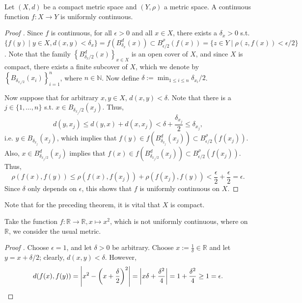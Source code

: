 \begin{theorem}\label{thrm:cont_func_on_comp_metric_space_uniformly_continuous}
	Let $(X, d)$ be a compact metric space and $(Y, \rho)$ a metric space. A continuous function $f: X\to Y$ is uniformly continuous. 
\end{theorem}

\begin{proof}[Proof \cite{1605098}]
	Since $f$ is continuous, for all $\epsilon > 0$ and all $x\in X$, there exists a $\delta_x > 0$ s.t. $\{f(y)\mid y\in X, d(x, y) < \delta_x\} = f\left(B^{d}_{\delta_x}(x)\right) \subset B^{\rho}_{\epsilon/2}(f(x)) = \{z\in Y\mid \rho(z, f(x)) < \epsilon/2\}$. Note that the family $\left\{B_{\delta_x/2}^{d}(x)\right\}_{x\in X}$ is an open cover of $X$, and since $X$ is compact, there exists a finite subcover of $X$, which we denote by $\left\{B_{\delta_{x_i/2}}(x_i)\right\}_{i=1}^{n}$, where $n\in\mathbb N$. Now define $\delta := \min_{1 \leq i \leq n}\delta_{x_i}/2$.
	
	Now suppose that for arbitrary $x, y\in X$, $d(x, y) < \delta$. Note that there is a $j \in \{1, \dots, n\}$ s.t. $x\in B_{\delta_{x_{j}}/2}(x_{j})$. Thus, $$d(y, x_j)\leq d(y, x) + d(x, x_j) < \delta + \frac{\delta_{x_j}}{2} \leq \delta_{x_j},$$ i.e. $y\in B_{\delta_{x_j}}(x_j)$, which implies that $f(y)\in f\left(B^{d}_{\delta_{x_j}}(x_j)\right) \subset B_{\epsilon/2}^{\rho}(f(x_j))$. Also, $x\in B^{d}_{\delta_{x_j/2}}(x_j)$ implies that $f(x)\in f\left(B^{d}_{\delta_{x_j/2}}(x_j)\right) \subset B_{\epsilon/2}^{\rho}(f(x_j))$. Thus, $$\rho(f(x), f(y)) \leq \rho(f(x), f(x_j)) + \rho(f(x_j), f(y)) < \frac{\epsilon}{2} + \frac{\epsilon}{2} = \epsilon.$$ Since $\delta$ only depends on $\epsilon$, this shows that $f$ is uniformly continuous on $X$.
\end{proof}

\begin{remark}
	Note that for the preceding theorem, it is vital that $X$ is compact.
\end{remark}

\begin{exmp}
	Take the function $f: \mathbb R\to \mathbb R, x\mapsto x^2$, which is not uniformly continuous, where on $\mathbb R$, we consider the usual metric.
\end{exmp}

\begin{proof}[Proof \cite{503101}]
	Choose $\epsilon = 1$, and let $\delta > 0$ be arbitrary. Choose $x := \frac{1}{\delta}\in\mathbb R$ and let $y = x + \delta/2$; clearly, $d(x, y) < \delta$. However, $$d(f(x), f(y)) = \left\vert x^2 - \left(x + \frac{\delta}{2}\right)^2 \right\vert = \left\vert x\delta + \frac{\delta^2}{4} \right\vert = 1 + \frac{\delta^2}{4} \geq 1 = \epsilon.$$
\end{proof}